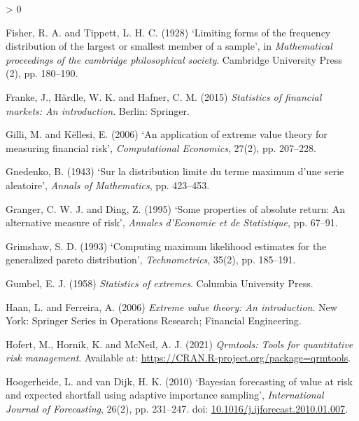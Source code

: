 \documentclass[a4paper,11pt]{article}
\newlength{\cslhangindent}
\newenvironment{CSLReferences}[2] %
 {%
  \setlength{\parindent}{0pt}
  \ifodd #1 \everypar{\setlength{\hangindent}{\cslhangindent}}\ignorespaces\fi
  \ifnum #2 > 0
  \setlength{\parskip}{#2\baselineskip}
  \fi
 }%
 {}
\theoremstyle{definition}
\theoremstyle{definition}
\theoremstyle{definition}
\theoremstyle{definition}
\theoremstyle{remark}
\begin{document}
\begin{CSLReferences}{0}{0}
\leavevmode\hypertarget{ref-fisher1928limiting}{}%
Fisher, R. A. and Tippett, L. H. C. (1928) {`Limiting forms of the frequency distribution of the largest or smallest member of a sample'}, in \emph{Mathematical proceedings of the cambridge philosophical society}. Cambridge University Press (2), pp. 180--190.

\leavevmode\hypertarget{ref-franke2015statistics}{}%
Franke, J., Härdle, W. K. and Hafner, C. M. (2015) \emph{Statistics of financial markets: An introduction}. Berlin: Springer.

\leavevmode\hypertarget{ref-gilli2006}{}%
Gilli, M. and Këllesi, E. (2006) {`An application of extreme value theory for measuring financial risk'}, \emph{Computational Economics}, 27(2), pp. 207--228.

\leavevmode\hypertarget{ref-gnedenko1943distribution}{}%
Gnedenko, B. (1943) {`Sur la distribution limite du terme maximum d'une serie aleatoire'}, \emph{Annals of Mathematics}, pp. 423--453.

\leavevmode\hypertarget{ref-granger1995some}{}%
Granger, C. W. J. and Ding, Z. (1995) {`Some properties of absolute return: An alternative measure of risk'}, \emph{Annales d'Economie et de Statistique}, pp. 67--91.

\leavevmode\hypertarget{ref-grimshaw1993computing}{}%
Grimshaw, S. D. (1993) {`Computing maximum likelihood estimates for the generalized pareto distribution'}, \emph{Technometrics}, 35(2), pp. 185--191.

\leavevmode\hypertarget{ref-gumbel1958statistics}{}%
Gumbel, E. J. (1958) \emph{Statistics of extremes}. Columbia University Press.

\leavevmode\hypertarget{ref-haan2006extreme}{}%
Haan, L. and Ferreira, A. (2006) \emph{Extreme value theory: An introduction}. New York: Springer Series in Operations Research; Financial Engineering.

\leavevmode\hypertarget{ref-qrmtools}{}%
Hofert, M., Hornik, K. and McNeil, A. J. (2021) \emph{Qrmtools: Tools for quantitative risk management}. Available at: \url{https://CRAN.R-project.org/package=qrmtools}.

\leavevmode\hypertarget{ref-Hoogerheide2010}{}%
Hoogerheide, L. and van Dijk, H. K. (2010) {`Bayesian forecasting of value at risk and expected shortfall using adaptive importance sampling'}, \emph{International Journal of Forecasting}, 26(2), pp. 231--247. doi: \href{https://doi.org/10.1016/j.ijforecast.2010.01.007}{10.1016/j.ijforecast.2010.01.007}.


\end{CSLReferences}
\end{document}
